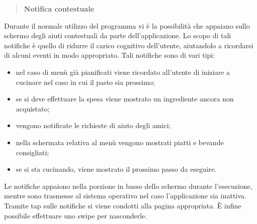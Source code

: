\begin{quote}
 \textbf{Notifica contestuale}
\end{quote}
Durante il normale utilizzo del programma vi è la possibilità che appaiano sullo schermo degli aiuti contestuali da parte dell'applicazione.
Lo scopo di tali notifiche è quello di ridurre il carico cognitivo dell'utente, aiutandolo a ricordarsi di alcuni eventi in modo appropriato.
Tali notifiche sono di vari tipi: 
\begin{itemize}
 \item nel caso di menù già pianificati viene ricordato all'utente di iniziare a cucinare nel caso in cui il pasto sia prossimo;
 \item se si deve effettuare la spesa viene mostrato un ingrediente ancora non acquistato;
 \item vengono notificate le richieste di aiuto degli amici;
 \item nella schermata relativa al menù vengono mostrati piatti e bevande consigliati;
 \item se si sta cucinando, viene mostrato il prossimo passo da eseguire.
\end{itemize}
Le notifiche appaiono nella porzione in basso dello schermo durante l'esecuzione, mentre sono trasmesse al sistema operativo nel caso l'applicazione
sia inattiva. Tramite tap sulle notifiche si viene condotti alla pagina appropriata. È infine possibile effettuare uno swipe per nasconderle.
